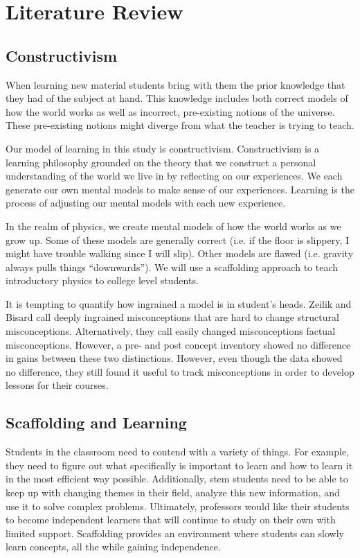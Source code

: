 \chapter[Literature Review]{Literature Review}

\section{Constructivism}

When learning new material students bring with them the prior knowledge that they had of the subject at hand. This knowledge includes both correct models of how the world works as well as incorrect, pre-existing notions of the universe. These pre-existing notions might diverge from what the teacher is trying to teach.

Our model of learning in this study is constructivism. Constructivism is a learning philosophy grounded on the theory that we construct a personal understanding of the world we live in by reflecting on our experiences. We each generate our own mental models to make sense of our experiences. Learning is the process of adjusting our mental models with each new experience.

In the realm of physics, we create mental models of how the world works as we grow up. Some of these models are generally correct (i.e. if the floor is slippery, I might have trouble walking since I will slip). Other models are flawed (i.e. gravity always pulls things “downwards”). We will use a scaffolding approach to teach introductory physics to college level students.

It is tempting to quantify how ingrained a model is in student's heads. Zeilik and Bisard call deeply ingrained misconceptions that are hard to change structural misconceptions. Alternatively, they call easily changed misconceptions factual misconceptions\cite{zeilik2000}. However, a pre- and post concept inventory showed no difference in gains between these two distinctions. However, even though the data showed no difference, they still found it useful to track misconceptions in order to develop lessons for their courses.

\section{Scaffolding and Learning}

Students in the classroom need to contend with a variety of things. For example, they need to figure out what specifically is important to learn and how to learn it in the most efficient way possible. Additionally, \gls{stem} students need to be able to keep up with changing themes in their field, analyze this new information, and use it to solve complex problems. Ultimately, professors would like their students to become independent learners that will continue to study on their own with limited support. Scaffolding provides an environment where students can slowly learn concepts, all the while gaining independence\cite{larkin2002}.

